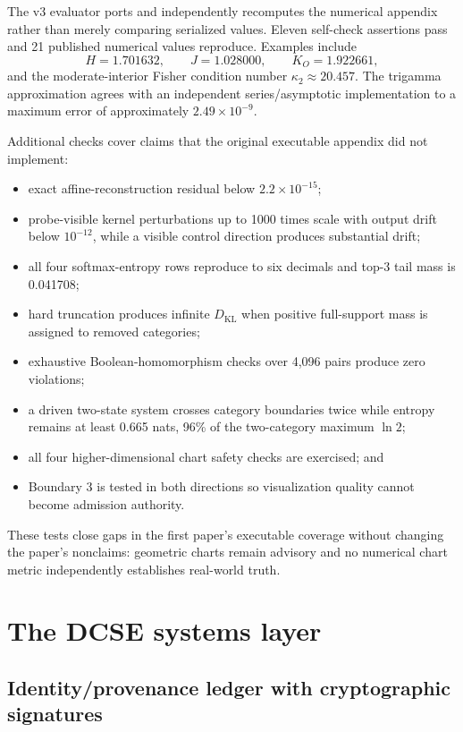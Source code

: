 \documentclass[11pt]{article}
\begin{document}
The v3 evaluator ports and independently recomputes the numerical appendix rather than merely comparing serialized values. Eleven self-check assertions pass and 21 published numerical values reproduce. Examples include
\[
H=1.701632,\qquad J=1.028000,\qquad K_O=1.922661,
\]
and the moderate-interior Fisher condition number \(\kappa_2\approx20.457\). The trigamma approximation agrees with an independent series/asymptotic implementation to a maximum error of approximately \(2.49\times10^{-9}\).
\newpage

Additional checks cover claims that the original executable appendix did not implement:

\begin{itemize}
  \item exact affine-reconstruction residual below \(2.2\times10^{-15}\);
  \item probe-visible kernel perturbations up to 1000 times scale with output drift below \(10^{-12}\), while a visible control direction produces substantial drift;
  \item all four softmax-entropy rows reproduce to six decimals and top-3 tail mass is 0.041708;
  \item hard truncation produces infinite \(D_{\mathrm{KL}}\) when positive full-support mass is assigned to removed categories;
  \item exhaustive Boolean-homomorphism checks over 4,096 pairs produce zero violations;
  \item a driven two-state system crosses category boundaries twice while entropy remains at least 0.665 nats, 96\% of the two-category maximum \(\ln 2\);
  \item all four higher-dimensional chart safety checks are exercised; and
  \item Boundary 3 is tested in both directions so visualization quality cannot become admission authority.
\end{itemize}

These tests close gaps in the first paper's executable coverage without changing the paper's nonclaims: geometric charts remain advisory and no numerical chart metric independently establishes real-world truth.

\section{The DCSE systems layer}

\subsection{Identity/provenance ledger with cryptographic signatures}
\end{document}
